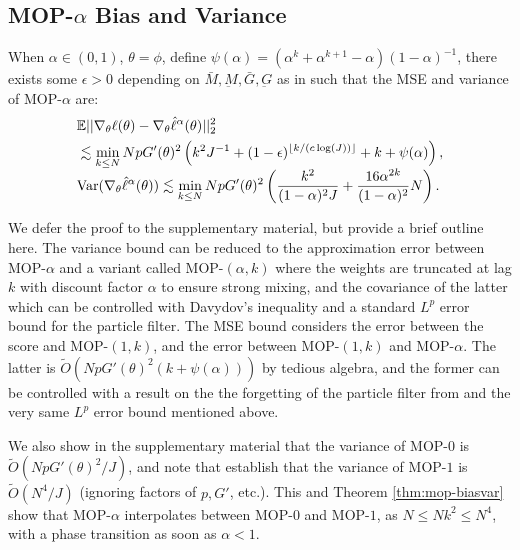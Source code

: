 \documentclass[11pt]{article}
\begin{document}
\subsection{MOP-$\alpha$ Bias and Variance}
\begin{thm}
    \label{thm:mop-biasvar}
    When $\alpha\in(0,1)$, $\theta=\phi$, define $\psi(\alpha)=(\alpha^k  + \alpha^{k+1} - \alpha)(1-\alpha)^{-1}$, there exists some $\epsilon>0$ depending on $\bar{M}, \underbar{M}, \bar{G}, \underbar{G}$ as in \cite{karjalainen23} such that the MSE and variance of MOP-$\alpha$ are:
    \vspace*{-1ex}
    \begin{align*}
        &\mathbb{E}||\nabla_\theta\ell(\theta) - \nabla_\theta \hat\ell^\alpha(\theta)||_2^2 
        \\
        &\lesssim \min_{k \leq N} NpG'(\theta)^2\left(k^2J^{-1}+(1-\epsilon)^{\lfloor k/(c\log(J)) \rfloor}+k+\psi(\alpha)\right),\\[-1ex]
        &\text{Var}(\nabla_\theta \hat\ell^{\alpha}(\theta)) \lesssim \min_{k\leq N} NpG'(\theta)^2\left(\frac{k^2}{(1-\alpha)^2J} + \frac{16\alpha^{2k}}{(1-\alpha)^2}N\right).
        \end{align*}
\end{thm}


We defer the proof to the supplementary material, but provide a brief outline here. The variance bound can be reduced to the approximation error between MOP-$\alpha$ and a variant called MOP-$(\alpha,k)$ where the weights are truncated at lag $k$ with discount factor $\alpha$ to ensure strong mixing, and the covariance of the latter which can be controlled with Davydov's inequality and a standard $L^p$ error bound for the particle filter. The MSE bound considers the error between the score and MOP-$(1,k)$, and the error between MOP-$(1,k)$ and MOP-$\alpha$. The latter is $\tilde{O}(NpG'(\theta)^2(k+\psi(\alpha)))$ by tedious algebra, and the former can be controlled with a result on the the forgetting of the particle filter from \cite{karjalainen23} and the very same $L^p$ error bound mentioned above. 

We also show in the supplementary material that the variance of MOP-$0$ is $\tilde{O}(NpG'(\theta)^2/J)$, and note that \cite{poyiadjis11} establish that the variance of MOP-$1$ is $\tilde{O}(N^4/J)$ (ignoring factors of $p, G'$, etc.). This and Theorem \ref{thm:mop-biasvar} show that MOP-$\alpha$ interpolates between MOP-$0$ and MOP-$1$, as $N \leq Nk^2 \leq N^4$, with a phase transition as soon as $\alpha<1$. 
\end{document}
